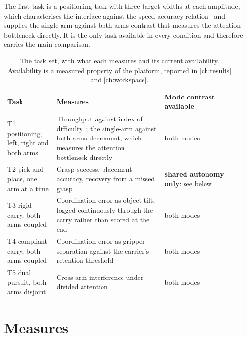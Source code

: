 The first task is a positioning task with three target widths at each
amplitude, which characterises the interface against the speed-accuracy
relation~\cite{fitts1954information} and supplies the single-arm against
both-arms contrast that measures the attention bottleneck directly. It is the
only task available in every condition and therefore carries the main
comparison.

\begin{table}[htbp]
  \centering
  \caption[Task set]{The task set, with what each measures and its current
  availability. Availability is a measured property of the platform, reported
  in \cref{ch:results} and \cref{ch:workspace}.}
  \label{tab:taskset}
  \begin{tabular}{@{}p{0.20\linewidth}p{0.44\linewidth}p{0.30\linewidth}@{}}
    \toprule
    Task & Measures & Mode contrast available \\
    \midrule
    T1 positioning, left, right and both arms & Throughput against index of
      difficulty~\cite{fitts1954information}; the single-arm against
      both-arms decrement, which measures the attention bottleneck directly &
      both modes \\
    T2 pick and place, one arm at a time & Grasp success, placement accuracy,
      recovery from a missed grasp & \textbf{shared autonomy only}: see below \\
    T3 rigid carry, both arms coupled & Coordination error as object tilt,
      logged continuously through the carry rather than scored at the end &
      both modes \\
    T4 compliant carry, both arms coupled & Coordination error as gripper
      separation against the carrier's retention threshold & both modes \\
    T5 dual pursuit, both arms disjoint & Cross-arm interference under divided
      attention & both modes \\
    \bottomrule
  \end{tabular}
\end{table}

\section{Measures}

